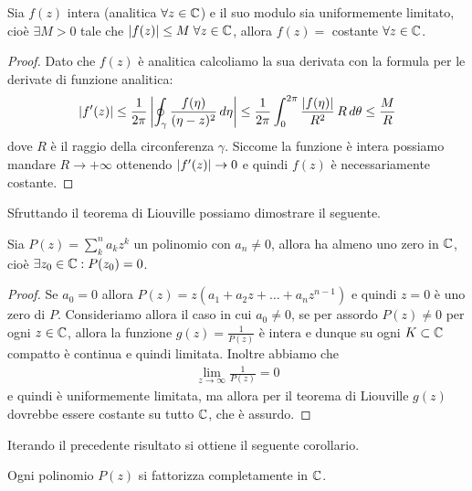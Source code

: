 \begin{theorem}[ di Liouville ]
  Sia $ f(z) $ intera (analitica $ \forall z\in \mathbb{C} $) e il suo modulo sia uniformemente limitato, cioè 
  $ \exists M > 0 $ tale che $ |f(z)| \leq M \; \forall z \in \mathbb{C} $, allora $ f(z) = $ costante $ \forall z \in \mathbb{C} $.
\end{theorem}
\begin{proof}
  Dato che $ f(z) $ è analitica calcoliamo la sua derivata con la formula per le derivate di funzione analitica:
  \begin{align}
    \left|{f'(z)}\right| \leq \frac{1}{2\pi} \left|{\oint_\gamma \frac{f(\eta)}{(\eta - z)^2} \, d\eta}\right| 
    \leq \frac1{2\pi} \int_0^{2\pi} \frac{\left|{f(\eta)}\right|}{R^2} \, R \,d\theta \leq \frac{M}{R}
  \end{align}
  dove $ R $ è il raggio della circonferenza $ \gamma $. Siccome la funzione è intera possiamo mandare $ R \to +\infty $ ottenendo  
  $ \left|{f'(z)}\right| \to 0 $ e quindi $ f(z) $ è necessariamente costante.
\end{proof}

Sfruttando il teorema di Liouville possiamo dimostrare il seguente.

\begin{theorem}
  Sia $ P(z) = \sum_k^n a_k z^k $ un polinomio con $ a_n \neq 0 $, allora ha almeno uno zero in $ \mathbb{C} $, cioè $ \exists z_0 \in \mathbb{C} : P(z_0) = 0 $.
\end{theorem}
\begin{proof}
  Se $ a_0 = 0 $ allora $ P(z) = z (a_1 + a_2 z + \dots + a_n z^{n-1}) $ e quindi $ z = 0 $ è uno zero di $ P $. Consideriamo allora il caso in cui 
  $ a_0 \neq 0 $, se per assordo $ P(z) \neq 0 $ per ogni $ z \in \mathbb{C} $, allora la funzione $ g(z) = \frac1{P(z)} $ è intera e dunque su ogni 
  $ K \subset \mathbb{C} $ compatto è continua e quindi limitata. Inoltre abbiamo che 
  \begin{align}
    \lim_{z \to \infty} \frac1{P(z)} = 0
  \end{align}
  e quindi è uniformemente limitata, ma allora per il teorema di Liouville $ g(z) $ dovrebbe essere costante su tutto $ \mathbb{C} $, che è assurdo.
\end{proof}

Iterando il precedente risultato si ottiene il seguente corollario.

\begin{corollary}
  Ogni polinomio $ P(z) $ si fattorizza completamente in $ \mathbb{C} $.
\end{corollary}

